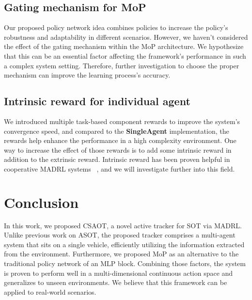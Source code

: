 \documentclass[sigconf]{aamas}
\begin{document}
\subsection{Gating mechanism for MoP}
Our proposed policy network idea combines policies to increase the policy's robustness and adaptability in different scenarios. However, we haven't considered the effect of the gating mechanism within the MoP architecture. We hypothesize that this can be an essential factor affecting the framework's performance in such a complex system setting. Therefore, further investigation to choose the proper mechanism can improve the learning process's accuracy.
\subsection{Intrinsic reward for individual agent}
We introduced multiple task-based component rewards to improve the system's convergence speed, and compared to the \textbf{SingleAgent} implementation, the rewards help enhance the performance in a high complexity environment. One way to increase the effect of those rewards is to add some intrinsic reward in addition to the extrinsic reward. Intrinsic reward has been proven helpful in cooperative MADRL systems ~\cite{9892092}, and we will investigate further into this field.

\section{Conclusion}

In this work, we proposed CSAOT, a novel active tracker for SOT via MADRL. Unlike previous work on ASOT, the proposed tracker comprises a multi-agent system that sits on a single vehicle, efficiently utilizing the information extracted from the environment. Furthermore, we proposed MoP as an alternative to the traditional policy network of an MLP block. Combining those factors, the system is proven to perform well in a multi-dimensional continuous action space and generalizes to unseen environments. We believe that this framework can be applied to real-world scenarios.



 


\end{document}
